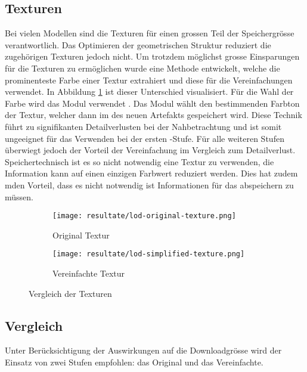 \subsection{Texturen}

Bei vielen Modellen sind die Texturen für einen grossen Teil der Speichergrösse verantwortlich. Das Optimieren der geometrischen Struktur reduziert die zugehörigen Texturen jedoch nicht. Um trotzdem möglichst grosse Einsparungen für die Texturen zu ermöglichen wurde eine Methode entwickelt, welche die prominenteste Farbe einer Textur extrahiert und diese für die Vereinfachungen verwendet.
In Abbildung \ref{fig:textureComparison} ist dieser Unterschied visualisiert. Für die Wahl der Farbe wird das Modul  verwendet \cite{averageColorPackage}. Das Modul wählt den bestimmenden Farbton der Textur, welcher dann im  des neuen Artefakts gespeichert wird.
Diese Technik führt zu signifikanten Detailverlusten bei der Nahbetrachtung und ist somit ungeeignet für das Verwenden bei der ersten -Stufe. Für alle weiteren Stufen überwiegt jedoch der Vorteil der Vereinfachung im Vergleich zum Detailverlust.
Speichertechnisch ist es so nicht notwendig eine Textur zu verwenden, die Information kann auf einen einzigen Farbwert reduziert werden. Dies hat zudem mden Vorteil, dass es nicht notwendig ist Informationen für das  abspeichern zu müssen.

\begin{figure}[H]
  \centering
  \begin{subfigure}{.4\textwidth}
    \centering
    \texttt{[image: resultate/lod-original-texture.png]}
    \caption{Original Textur}
  \end{subfigure}
  \begin{subfigure}{.4\textwidth}
    \centering
    \texttt{[image: resultate/lod-simplified-texture.png]}
    \caption{Vereinfachte Textur}
  \end{subfigure}
  \caption{Vergleich der Texturen}
  \label{fig:textureComparison}
\end{figure}

\subsection{Vergleich}

Unter Berücksichtigung der Auswirkungen auf die Downloadgrösse wird der Einsatz von zwei Stufen empfohlen: das Original und das Vereinfachte.

